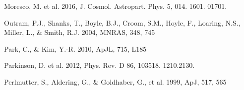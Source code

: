 \documentclass[twocolumn]{aastex61}
\begin{document}
\begin{thebibliography}{}



Moresco, M. et al. 2016, J. Cosmol. Astropart. Phys. 5, 014. 1601.
01701.

Outram, P.J., Shanks, T., Boyle, B.J., Croom, S.M., Hoyle, F., Loaring, N.S., 
Miller, L., \& Smith, R.J. 2004, MNRAS, 348, 745  





Park, C., \& Kim, Y.-R. 2010, ApJL, 715, L185  


Parkinson, D. et al. 2012, Phys. Rev. D 86, 103518. 1210.2130.




Perlmutter, S., Aldering, G., \& Goldhaber, G., et al. 1999, ApJ, 517, 565  


\end{thebibliography}
\end{document}
